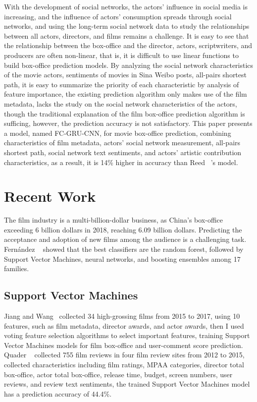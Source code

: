 \documentclass[review]{cvpr}
\begin{document}
  With the development of social networks, the actors' influence in social media is increasing,
  and the influence of actors' consumption spreads through social networks,
  and using the long-term social network data to study the relationships between all actors, directors, and films remains a challenge.
  It is easy to see that the relationship between the box-office and the director, actors, scriptwriters, and producers are often non-linear, that is,
  it is difficult to use linear functions to build box-office prediction models.
  By analyzing the social network characteristics of the movie actors, sentiments of movies in Sina Weibo posts, all-pairs shortest path,
  it is easy to summarize the priority of each characteristic by analysis of feature importance,
  the existing prediction algorithm only makes use of the film metadata, lacks the study on the social network characteristics of the actors,
  though the traditional explanation of the film box-office prediction algorithm is sufficing, however, the prediction accuracy is not satisfactory.
  This paper presents a model, named FC-GRU-CNN, for movie box-office prediction, combining characteristics of film metadata, actors' social network measurement,
  all-pairs shortest path, social network text sentiments, and actors' artistic contribution characteristics,
  as a result, it is 14\% higher in accuracy than Reed \etal~\cite{reed2016learning}'s model.


\section{Recent Work}

  The film industry is a multi-billion-dollar business, as China's box-office exceeding 6 billion dollars in 2018, reaching 6.09 billion dollars.
  Predicting the acceptance and adoption of new films among the audience is a challenging task.
  Fern{\'a}ndez \etal ~\cite{fernandez2014we} showed that the best classifiers are the random forest,
  followed by Support Vector Machines, neural networks, and boosting ensembles among 17 families.


\subsection{Support Vector Machines}

  Jiang and Wang~\cite{jiang2018predicting} collected 34 high-grossing films from 2015 to 2017, using 10 features, such as film metadata, director awards, and actor awards, then I used voting feature selection algorithms to select important features,
  training Support Vector Machines models for film box-office and user-comment score prediction.
  Quader \etal~\cite{quader2017machine} collected 755 film reviews in four film review sites from 2012 to 2015, collected characteristics including film ratings, MPAA categories,
  director total box-office, actor total box-office, release time, budget, screen numbers, user reviews, and review text sentiments,
  the trained Support Vector Machines model has a prediction accuracy of 44.4\%.
\end{document}

